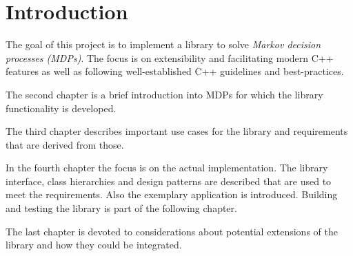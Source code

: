 \chapter{Introduction}


The goal of this project is to implement a library to solve \emph{Markov decision processes (MDPs)}. The focus is on extensibility and facilitating modern C++ features as well as following well-established C++ guidelines and best-practices. 

The second chapter is a brief introduction into MDPs for which the library functionality is developed.  

The third chapter describes important use cases for the library and requirements that are derived from those.

In the fourth chapter the focus is on the actual implementation.  The library interface, class hierarchies and design patterns are described that are used to meet the requirements. Also the exemplary application is introduced. 
Building and testing the library is part of the following chapter. 

The last chapter is devoted to considerations about potential extensions of the library and how they could be integrated. 
